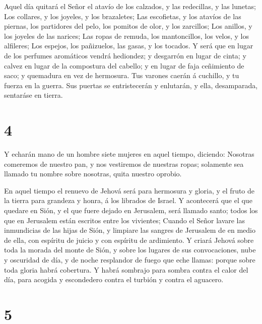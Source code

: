  Aquel día quitará el Señor el atavío de los calzados, y
las redecillas, y las lunetas;  Los collares, y los
joyeles, y los brazaletes;  Las escofietas, y los atavíos
de las piernas, los partidores del pelo, los pomitos de olor, y los
zarcillos;  Los anillos, y los joyeles de las narices;
 Las ropas de remuda, los mantoncillos, los velos, y los
alfileres;  Los espejos, los pañizuelos, las gasas, y los
tocados.  Y será que en lugar de los perfumes aromáticos
vendrá hediondez; y desgarrón en lugar de cinta; y calvez en lugar de la
compostura del cabello; y en lugar de faja ceñimiento de saco; y
quemadura en vez de hermosura.  Tus varones caerán á
cuchillo, y tu fuerza en la guerra.  Sus puertas se
entristecerán y enlutarán, y ella, desamparada, sentaráse en tierra.

\hypertarget{section-3}{%
\section{4}\label{section-3}}

 Y echarán mano de un hombre siete mujeres en aquel tiempo,
diciendo: Nosotras comeremos de nuestro pan, y nos vestiremos de
nuestras ropas; solamente sea llamado tu nombre sobre nosotras, quita
nuestro oprobio.

 En aquel tiempo el renuevo de Jehová será para hermosura y
gloria, y el fruto de la tierra para grandeza y honra, á los librados de
Israel.  Y acontecerá que el que quedare en Sión, y el que
fuere dejado en Jerusalem, será llamado santo; todos los que en
Jerusalem están escritos entre los vivientes;  Cuando el
Señor lavare las inmundicias de las hijas de Sión, y limpiare las
sangres de Jerusalem de en medio de ella, con espíritu de juicio y con
espíritu de ardimiento.  Y criará Jehová sobre toda la
morada del monte de Sión, y sobre los lugares de sus convocaciones, nube
y oscuridad de día, y de noche resplandor de fuego que eche llamas:
porque sobre toda gloria habrá cobertura.  Y habrá sombrajo
para sombra contra el calor del día, para acogida y escondedero contra
el turbión y contra el aguacero.

\hypertarget{section-4}{%
\section{5}\label{section-4}}

